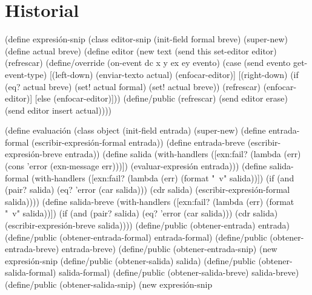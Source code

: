 \documentclass[10pt,oneside,openany,letterpaper]{book}
\begin{document}
\section{Historial}


\nwenddocs{}\endmoddef
(define expresión-snip%
  (class editor-snip%
    (init-field formal
                breve)
    (super-new)
    (define actual breve)
    (define editor (new text%
    (send this set-editor editor)
    (refrescar)
    (define/override (on-event dc x y ex ey evento)
      (case (send evento get-event-type)
        [(left-down)
         (enviar-texto actual)
         (enfocar-editor)]
        [(right-down)
         (if (eq? actual breve)
             (set! actual formal)
             (set! actual breve))
         (refrescar)
         (enfocar-editor)]
        [else
         (enfocar-editor)]))
    (define/public (refrescar)
      (send editor erase)
      (send editor insert actual))))

(define evaluación%
  (class object%
    (init-field entrada)
    (super-new)
    (define entrada-formal (escribir-expresión-formal entrada))
    (define entrada-breve (escribir-expresión-breve entrada))
    (define salida
      (with-handlers ([exn:fail? (lambda (err)
                                   (cons 'error (exn-message err)))])
        (evaluar-expresión entrada)))
    (define salida-formal
      (with-handlers ([exn:fail? (lambda (err)
                                   (format "~v" salida))])
        (if (and (pair? salida) (eq? 'error (car salida)))
            (cdr salida)
            (escribir-expresión-formal salida))))
    (define salida-breve
      (with-handlers ([exn:fail? (lambda (err)
                                   (format "~v" salida))])
        (if (and (pair? salida) (eq? 'error (car salida)))
            (cdr salida)
            (escribir-expresión-breve salida))))
    (define/public (obtener-entrada)
      entrada)
    (define/public (obtener-entrada-formal)
      entrada-formal)
    (define/public (obtener-entrada-breve)
      entrada-breve)
    (define/public (obtener-entrada-snip)
      (new expresión-snip%
    (define/public (obtener-salida)
      salida)
    (define/public (obtener-salida-formal)
      salida-formal)
    (define/public (obtener-salida-breve)
      salida-breve)
    (define/public (obtener-salida-snip)
      (new expresión-snip%
    
\end{document}
